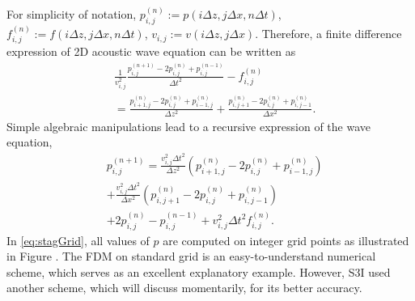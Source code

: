 \documentclass[11pt,titlepage]{article}
\theoremstyle{plain}
\theoremstyle{definition}
\theoremstyle{remark}
\numberwithin{equation}{section}
\begin{document}
For simplicity of notation, $p_{i,j}^{(n)}:=  p(i\Delta z, j\Delta x, n\Delta t)$, $f_{i,j}^{(n)} := f(i\Delta z, j\Delta x, n\Delta t)$, $v_{i,j} := v(i\Delta z, j\Delta x)$. Therefore, a finite difference expression of 2D acoustic wave equation can be written as 
  \begin{equation}
    \begin{aligned}
    &\frac{1}{v_{i,j}^2}\frac{p_{i,j}^{(n+1)} - 2p_{i,j}^{(n)} + p_{i,j}^{(n-1)}}{\Delta t^2} - f_{i,j}^{(n)}\\
    &= \frac{p_{i+1,j}^{(n)} - 2p_{i,j}^{(n)} + p_{i-1,j}^{(n)}}{\Delta z^2} + \frac{p_{i,j+1}^{(n)} - 2p_{i,j}^{(n)} + p_{i,j-1}^{(n)}}{\Delta x^2}.
    \end{aligned}
  \end{equation}
Simple algebraic manipulations lead to a recursive expression of the wave equation,
  \begin{equation}
  \label{eq:stagGrid}
    \begin{aligned}
    &p_{i,j}^{(n+1)} = \frac{v_{i,j}^2\Delta t^2}{\Delta z^2}\left(p_{i+1,j}^{(n)} - 2p_{i,j}^{(n)} + p_{i-1,j}^{(n)}\right)\\
    &+ \frac{v_{i,j}^2\Delta t^2}{\Delta x^2}\left(p_{i,j+1}^{(n)} - 2p_{i,j}^{(n)} + p_{i,j-1}^{(n)}\right)\\
    &+ 2p_{i,j}^{(n)}-p_{i,j}^{(n-1)} + v_{i,j}^2\Delta t^2 f_{i,j}^{(n)}.
    \end{aligned}
  \end{equation}
  In \eqref{eq:stagGrid}, all values of $p$ are computed on integer grid points as illustrated in Figure . The FDM on standard grid is an easy-to-understand numerical scheme, which serves as an excellent explanatory example. However, S3I used another scheme, which will discuss momentarily, for its better accuracy.  
  
\end{document}
